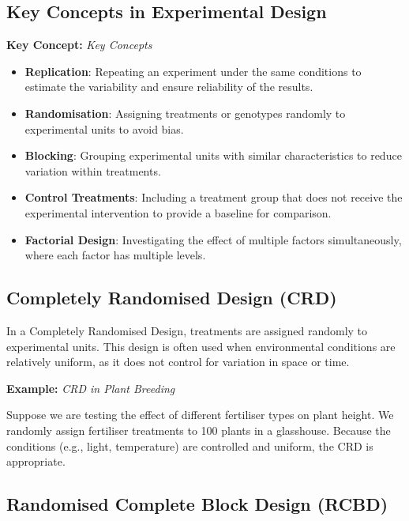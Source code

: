 \documentclass[12pt,a4paper]{article}
\newenvironment{keyconceptbox}[1][]
{\begin{basebox}[linecolor=uqblue]
\textbf{\color{uqblue}Key Concept:} \textit{#1}\par\noindent\ignorespaces}
{\end{basebox}}
\newenvironment{example}[1][]
{\begin{basebox}[linecolor=uqgold]
\textbf{\color{uqgold}Example:} \textit{#1}\par\noindent\ignorespaces}
{\end{basebox}}
\begin{document}
\subsection{Key Concepts in Experimental Design}

\begin{keyconceptbox}[Key Concepts]
\begin{itemize}
    \item \textbf{Replication}: Repeating an experiment under the same conditions to estimate the variability and ensure reliability of the results.
    \item \textbf{Randomisation}: Assigning treatments or genotypes randomly to experimental units to avoid bias.
    \item \textbf{Blocking}: Grouping experimental units with similar characteristics to reduce variation within treatments.
    \item \textbf{Control Treatments}: Including a treatment group that does not receive the experimental intervention to provide a baseline for comparison.
    \item \textbf{Factorial Design}: Investigating the effect of multiple factors simultaneously, where each factor has multiple levels.
\end{itemize}
\end{keyconceptbox}

\subsection{Completely Randomised Design (CRD)}

In a Completely Randomised Design, treatments are assigned randomly to experimental units. This design is often used when environmental conditions are relatively uniform, as it does not control for variation in space or time.

\begin{example}[CRD in Plant Breeding]
Suppose we are testing the effect of different fertiliser types on plant height. We randomly assign fertiliser treatments to 100 plants in a glasshouse. Because the conditions (e.g., light, temperature) are controlled and uniform, the CRD is appropriate.
\end{example}

\subsection{Randomised Complete Block Design (RCBD)}
\end{document}
